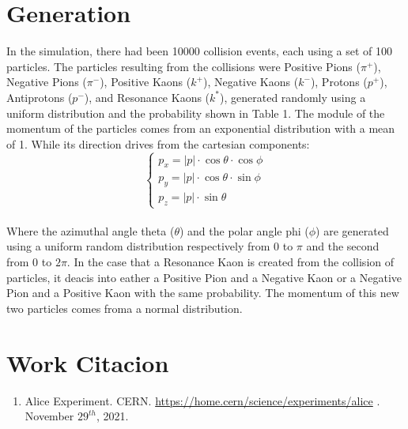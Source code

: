 \documentclass[a4paper, 11pt]{article}
\begin{document}
    \section{Generation}
      In the simulation, there had been 10000 collision events, each using a set of 100 particles. The particles resulting from the collisions were Positive Pions ($\pi^+$), Negative Pions ($\pi^-$), Positive Kaons ($k^+$), Negative Kaons ($k^-$), Protons ($p^+$), Antiprotons ($p^-$), and Resonance Kaons ($k^*$), generated randomly using a uniform distribution and the probability shown in Table 1.  The module of the momentum of the particles comes from an exponential distribution with a mean of 1. While its direction drives from the cartesian components:
      \begin{equation}
        \begin{cases}
          p_x = |p| \cdot \cos \theta \cdot \cos \phi\\
          p_y = |p| \cdot \cos \theta \cdot \sin \phi\\
          p_z = |p| \cdot \sin \theta
        \end{cases}
      \end{equation}\\
      Where the azimuthal angle theta ($\theta$) and the polar angle phi ($\phi$) are generated using a uniform random distribution respectively from 0 to $\pi$ and the second from 0 to $2\pi$.
      In the case that a Resonance Kaon is created from the collision of particles, it deacis into eather a Positive Pion and a Negative Kaon or a Negative Pion and a Positive Kaon with the same probability. The momentum of this new two particles comes froma a normal distribution.
    \section* {Work Citacion}
    \begin{enumerate}
      \item{Alice Experiment. CERN. \url{https://home.cern/science/experiments/alice} . November $29^{th}$, 2021.}
    \end{enumerate}
\end{document}
